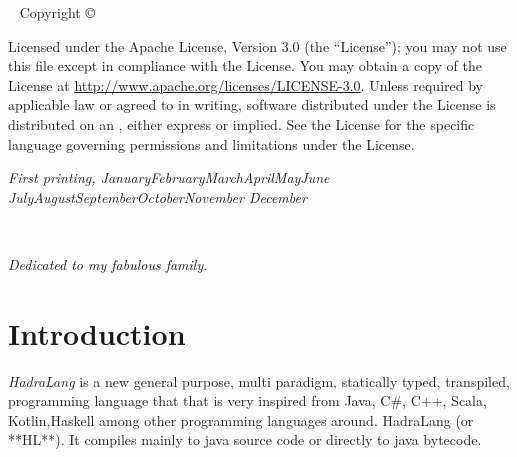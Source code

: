 \documentclass{tufte-book}
\newcommand{\monthyear}{%
	\ifcase\month\or January\or February\or March\or April\or May\or June\or
	July\or August\or September\or October\or November\or
	December\fi\space\number\year
}
\begin{document}
    
    \newpage
    \begin{fullwidth}
        ~\vfill
        \thispagestyle{empty}
        \setlength{\parindent}{0pt}
        \setlength{\parskip}{\baselineskip}
        Copyright \copyright\ \the\year\ \thanklessauthor
        
        \par{}
        
        \par{}
        
        \par Licensed under the Apache License, Version 3.0 (the ``License''); you may not
        use this file except in compliance with the License. You may obtain a copy
        of the License at \url{http://www.apache.org/licenses/LICENSE-3.0}. Unless
        required by applicable law or agreed to in writing, software distributed
        under the License is distributed on an , either express or implied. See the
        License for the specific language governing permissions and limitations
        under the License.
        
        \par\textit{First printing, \monthyear}
    \end{fullwidth}

    \tableofcontents

    \listoffigures

    \listoftables

    \cleardoublepage
    ~\vfill
    \begin{doublespace}
        \noindent\fontsize{18}{22}\selectfont\itshape
        \nohyphenation
        Dedicated to my fabulous family.
    \end{doublespace}
    \vfill
    \vfill


    \cleardoublepage
    \chapter*{Introduction}

        \textit{HadraLang} is a new general purpose, multi paradigm, statically typed, transpiled, programming language that that is very inspired from Java, C\#, C++, Scala, Kotlin,Haskell among other programming languages around. HadraLang (or **HL**). It compiles mainly to java source code or directly to java bytecode.
\end{document}
